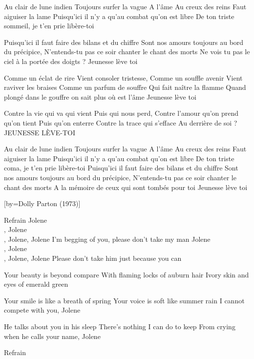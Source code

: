 \beginverse
Au clair de lune indien
Toujours surfer la vague
A l'âme
Au creux des reins
Faut aiguiser la lame
Puisqu'ici il n'y a qu'au combat qu'on est libre
De ton triste sommeil, je t'en prie libère-toi \!
\endverse

\beginverse
Puisqu'ici il faut faire des bilans et du chiffre
Sont nos amours toujours au bord du précipice,
N'entends-tu pas ce soir chanter le chant des morts
Ne vois tu pas le ciel à la portée des doigts ?
Jeunesse lève toi \!
\endverse

\beginverse
Comme un éclat de rire
Vient consoler tristesse,
Comme un souffle avenir
Vient raviver les braises
Comme un parfum de souffre
Qui fait naître la flamme
Quand plongé dans le gouffre on sait plus où est l'âme
Jeunesse lève toi \!
\endverse

\beginverse
Contre la vie qui va qui vient
Puis qui nous perd,
Contre l'amour qu'on prend qu'on tient
Puis qu'on enterre
Contre la trace qui s'efface
Au derrière de soi ?
JEUNESSE LÈVE-TOI \!
\endverse

\beginverse
Au clair de lune indien
Toujours surfer la vague
A l'âme
Au creux des reins
Faut aiguiser la lame
Puisqu'ici il n'y a qu'au combat qu'on est libre
De ton triste coma, je t'en prie libère-toi \!
Puisqu'ici il faut faire des bilans et du chiffre
Sont nos amours toujours au bord du précipice,
N'entends-tu pas ce soir chanter le chant des morts
A la mémoire de ceux qui sont tombés pour toi
Jeunesse lève toi
\endverse

[by={Dolly Parton (1973)}]

\beginverse
Refrain
Jolene \\[Jolene], Jolene \\[Jolene], Jolene, Jolene
I'm begging of you, please don't take my man
Jolene \\[Jolene], Jolene \\[Jolene], Jolene, Jolene
Please don't take him just because you can
\endverse

\beginverse
Your beauty is beyond compare
With flaming locks of auburn hair
Ivory skin and eyes of emerald green
\endverse

\beginverse
Your smile is like a breath of spring
Your voice is soft like summer rain
I cannot compete with you, Jolene
\endverse

\beginverse
He talks about you in his sleep
There's nothing I can do to keep
From crying when he calls your name, Jolene
\endverse

\beginverse
Refrain
\endverse

